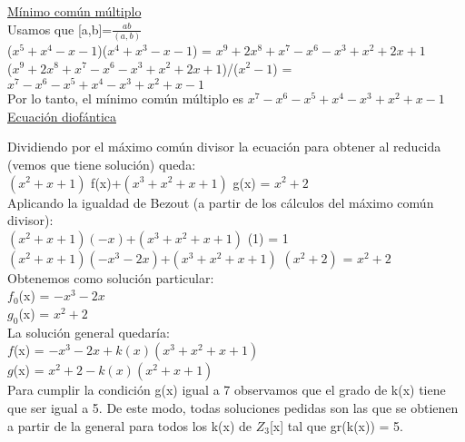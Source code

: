 \documentclass[11pt, a4paper, titlepage]{article}
\begin{document}
     \underline{Mínimo común múltiplo} \\
     
     Usamos que [a,b]=$\displaystyle{\frac { ab }{ (a,b) } }$ \\
     
     ($x^{5}+x^{4} -x-1$)($x^{4}+x^{3}-x-1$) = $x^{9}+2x^{8}+x^{7}-x^{6}-x^{3}+x^{2}+2x+1$ \\
     
    ($x^{9}+2x^{8}+x^{7}-x^{6}-x^{3}+x^{2}+2x+1$)/($x^{2}-1$) = $x^{7}-x^{6}-x^{5}+x^{4}-x^{3}+x^{2}+x-1$ \\
     
Por lo tanto, el mínimo común múltiplo es $x^{7}-x^{6}-x^{5}+x^{4}-x^{3}+x^{2}+x-1$
\ \\
     
     \underline{Ecuación diofántica} 
     
     Dividiendo por el máximo común divisor la ecuación para obtener al reducida (vemos que tiene solución) queda: \\
     
     $(x^{2}+x+1)$ f(x)+$(x^{3}+x^{2}+x+1)$ g(x) = $x^{2}+2$ \\
     
     Aplicando la igualdad de Bezout (a partir de los cálculos del máximo común divisor): \\
     
     $(x^{2}+x+1)(-x)$+$(x^{3}+x^{2}+x+1)$ (1) = 1 \\
     
     $(x^{2}+x+1)$$(-x^{3}-2x)$+$(x^{3}+x^{2}+x+1)$ $(x^{2}+2)$ = $x^{2}+2$ \\
     
     Obtenemos como solución particular: \\
     
     $f_{0}$(x) = $-x^{3}-2x$ \\
     
     $g_{0}$(x) = $x^{2}+2$ \\
     
     La solución general quedaría: \\
     
     $f$(x) = $-x^{3}-2x +k(x)(x^{3}+x^{2}+x+1)$  \\
     
     $g$(x) = $x^{2}+2 -k(x)(x^{2}+x+1)$ \\
     
     Para cumplir la condición  g(x) igual a 7 observamos que el grado de k(x) tiene que ser igual a 5. De este modo, todas soluciones pedidas son las que se obtienen a partir de la general para todos los k(x) de $Z_{3}$[x] tal que gr(k(x)) = 5. 
\end{document}
